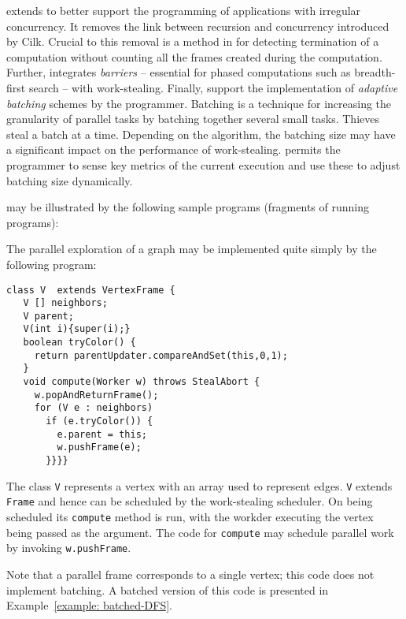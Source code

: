 \XWS{} extends \CWS{} to better support the programming of
applications with irregular concurrency. It removes the link between
recursion and concurrency introduced by Cilk. Crucial to this removal
is a method in \XWS{} for detecting termination of a computation
without counting all the frames created during the computation.
Further, \XWS integrates {\em barriers} -- essential for phased
computations such as breadth-first search -- with
work-stealing. Finally, \XWS{} support the implementation of {\em
adaptive batching} schemes by the programmer. Batching is a technique
for increasing the granularity of parallel tasks by batching together
several small tasks. Thieves steal a batch at a time. Depending on the
algorithm, the batching size may have a significant impact on the
performance of work-stealing. \XWS{} permits the programmer to sense
key metrics of the current execution and use these to adjust batching
size dynamically. 


\XWS{} may be illustrated by the following sample programs (fragments
of running programs):

\begin{example} \label{example:dfs}
The parallel exploration of a graph may be implemented quite simply by the following program:
{\footnotesize
\begin{verbatim}
class V  extends VertexFrame {
   V [] neighbors;
   V parent;
   V(int i){super(i);}
   boolean tryColor() {
     return parentUpdater.compareAndSet(this,0,1);
   }
   void compute(Worker w) throws StealAbort {
     w.popAndReturnFrame();
     for (V e : neighbors) 
       if (e.tryColor()) {
         e.parent = this;
         w.pushFrame(e);
       }}}}
\end{verbatim}}
The class {\tt V} represents a vertex with an array used to represent
edges. {\tt V} extends {\tt Frame} and hence can be scheduled by the
work-stealing scheduler. On being scheduled its {\tt compute} method
is run, with the workder executing the vertex being passed as the
argument. The code for {\tt compute} may schedule parallel work by
invoking {\tt w.pushFrame}. 

Note that a parallel frame corresponds to a single vertex; this code
does not implement batching. A batched version of this code is
presented in Example~\ref{example: batched-DFS}.
\end{example}

